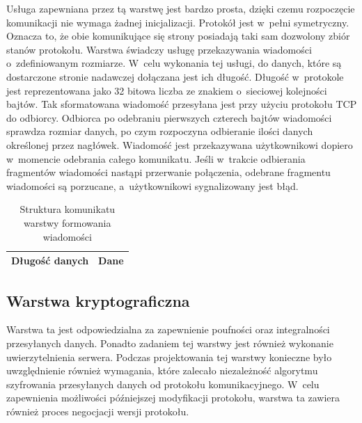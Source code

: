 Usługa zapewniana przez tą warstwę jest bardzo prosta, dzięki czemu
rozpoczęcie komunikacji nie wymaga żadnej inicjalizacji. Protokół jest
w~pełni symetryczny. Oznacza to, że obie komunikujące się strony
posiadają taki sam dozwolony zbiór stanów protokołu. Warstwa świadczy
usługę przekazywania wiadomości o~zdefiniowanym rozmiarze. W~celu
wykonania tej usługi, do danych, które są dostarczone stronie
nadawczej dołączana jest ich długość. Długość w~protokole jest
reprezentowana jako 32 bitowa liczba ze znakiem o~sieciowej kolejności
bajtów. Tak sformatowana wiadomość przesyłana jest przy użyciu
protokołu TCP do odbiorcy. Odbiorca po odebraniu pierwszych czterech
bajtów wiadomości sprawdza rozmiar danych, po czym rozpoczyna
odbieranie ilości danych określonej przez nagłówek. Wiadomość jest
przekazywana użytkownikowi dopiero w~momencie odebrania całego
komunikatu. Jeśli w~trakcie odbierania fragmentów wiadomości nastąpi
przerwanie połączenia, odebrane fragmentu wiadomości są porzucane,
a~użytkownikowi sygnalizowany jest błąd.

\begin{table}[H]
\centering
\caption{Struktura komunikatu warstwy formowania wiadomości}

\begin{tabular}{|p{3cm}|p{6cm}|}
\hline
Długość danych & Dane\\
\hline
\end{tabular}
\end{table}

\subsection[Warstwa kryptograficzna][Warstwa kryptograficzna]{Warstwa kryptograficzna}

Warstwa ta jest odpowiedzialna za zapewnienie poufności oraz
integralności przesyłanych danych. Ponadto zadaniem tej warstwy jest
również wykonanie uwierzytelnienia serwera. Podczas projektowania tej
warstwy konieczne było uwzględnienie również wymagania, które zalecało
niezależność algorytmu szyfrowania przesyłanych danych od protokołu
komunikacyjnego. W~celu zapewnienia możliwości późniejszej modyfikacji
protokołu, warstwa ta zawiera również proces negocjacji wersji
protokołu.

